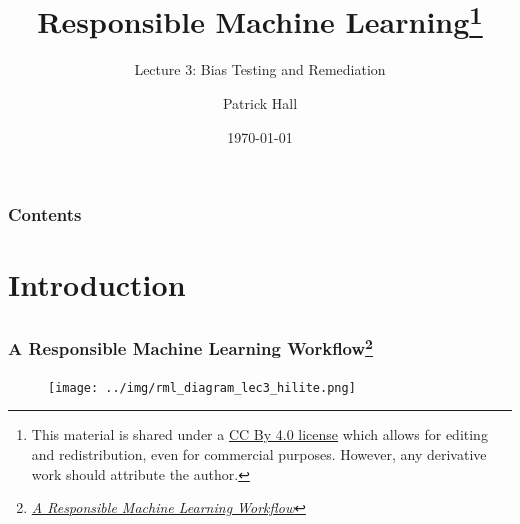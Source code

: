 \documentclass[11pt,aspectratio=169,hyperref={colorlinks}]{beamer}
\author{Patrick Hall}
\title{Responsible Machine Learning\footnote{\tiny{This material is shared under a \href{https://creativecommons.org/licenses/by/4.0/deed.ast}{CC By 4.0 license} which allows for editing and redistribution, even for commercial purposes. However, any derivative work should attribute the author.}}}
\subtitle{Lecture 3: Bias Testing and Remediation}
\institute{The George Washington University}
\date{\today}
\begin{document}
	
	\maketitle
	
	\begin{frame}
	
		\frametitle{Contents}
		
		\tableofcontents{}
		
	\end{frame}


	\section{Introduction}

		\subsection*{}

		\begin{frame}
		
			\frametitle{A Responsible Machine Learning Workflow\footnote{\href{https://www.mdpi.com/2078-2489/11/3/137/htm}{\textit{A Responsible Machine Learning Workflow}}}}
			
			\begin{figure}[htb]
				\begin{center}
					\texttt{[image: ../img/rml\_diagram\_lec3\_hilite.png]}
					\label{fig:blueprint}
				\end{center}
			\end{figure}		
					
		\end{frame}	
\end{document}
